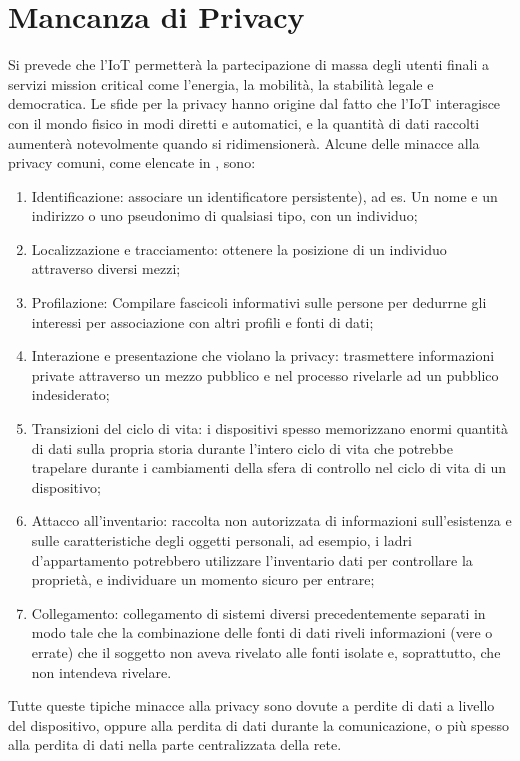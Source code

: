 \documentclass[a4paper,12pt,draft]{article}
\begin{document}
\section{Mancanza di Privacy}
Si prevede che l'IoT permetterà la partecipazione di massa degli utenti finali a servizi mission critical come l'energia, la  mobilità, la stabilità legale e democratica. Le sfide per la privacy hanno origine dal fatto che l'IoT interagisce con il mondo fisico in modi diretti e automatici, e la quantità di dati raccolti aumenterà notevolmente quando si ridimensionerà. Alcune  delle minacce alla privacy comuni, come elencate in \cite{37}, sono:

\begin{enumerate}

	\item
	      Identificazione: associare un identificatore  persistente), ad es. Un nome e un indirizzo o uno pseudonimo di qualsiasi tipo, con un individuo;
	\item
	      Localizzazione e tracciamento: ottenere la posizione di un individuo attraverso diversi mezzi;
	\item
	      Profilazione: Compilare fascicoli informativi sulle persone per dedurrne gli interessi per
	      associazione con altri profili e fonti di dati;
	\item
	      Interazione e presentazione che violano la privacy: trasmettere informazioni private attraverso un mezzo pubblico e nel processo rivelarle ad un pubblico indesiderato;
	\item
	      Transizioni del ciclo di vita: i dispositivi spesso memorizzano enormi quantità di dati sulla propria storia durante l'intero ciclo di vita che potrebbe trapelare durante i cambiamenti della sfera di controllo nel ciclo di vita di un dispositivo;
	\item
	      Attacco all'inventario: raccolta non autorizzata di informazioni sull'esistenza e sulle caratteristiche degli oggetti personali, ad esempio, i ladri d'appartamento potrebbero utilizzare l'inventario dati per controllare la proprietà, e individuare un momento sicuro per entrare;
	\item
	      Collegamento: collegamento di sistemi diversi precedentemente separati in modo tale che la combinazione delle fonti di dati riveli informazioni (vere o errate) che il soggetto non aveva rivelato alle fonti isolate e, soprattutto, che non intendeva rivelare.
\end{enumerate}
Tutte queste tipiche minacce alla privacy sono dovute a perdite di dati a livello del dispositivo, oppure alla perdita di dati durante la comunicazione, o più spesso alla perdita di dati nella parte centralizzata della rete.
\end{document}
